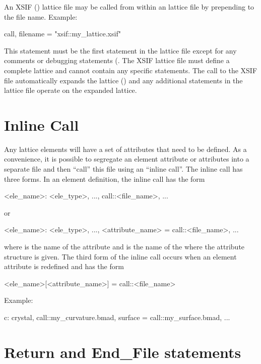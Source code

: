 {{An XSIF () lattice file may be called
from within an \bmad lattice file by prepending  to the
file name. Example:
\begin{example}
  call, filename = "xsif::my_lattice.xsif"
\end{example}
This statement must be the first statement in the \bmad lattice file
except for any comments or debugging statements (. 
The XSIF lattice file must define a
complete lattice and cannot contain any \bmad specific statements. The
call to the XSIF file automatically expands the lattice
() and any additional statements in the \bmad lattice
file operate on the expanded lattice.

\section{Inline Call}
\label{s:call.inline}

Any lattice elements will have a set of attributes that need to be defined.
As a convenience, it is possible to segregate an element attribute or attributes
into a separate file and then ``call'' this file using an
``inline call''. The inline call has three forms. In an element definition,
the inline call has the form
\begin{example}
  <ele_name>: <ele_type>, ..., call::<file_name>, ...
\end{example}
or
\begin{example}
  <ele_name>: <ele_type>, ..., <attribute_name> = call::<file_name>, ...
\end{example}
where  is the name of the attribute and
 is the name of the where the attribute structure is
given.  The third form of the inline call occurs when an element
attribute is redefined and has the form
\begin{example}
  <ele_name>[<attribute_name>] = call::<file_name>
\end{example}
Example:
\begin{example}
  c: crystal, call::my_curvature.bmad, surface = call::my_surface.bmad, ...
\end{example}  


\section{Return and End_File statements}

}}
